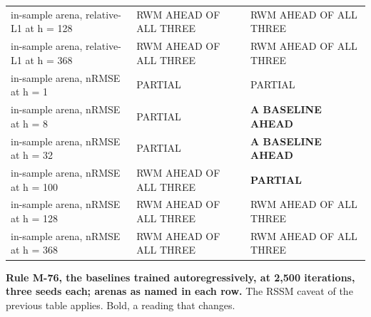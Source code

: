 \documentclass[10pt]{article}
\begin{document}
\begin{center}
{\begin{tabular}{lll}
in-sample arena, relative-L1 at h = 128 & RWM AHEAD OF ALL THREE & RWM AHEAD OF ALL THREE \\
in-sample arena, relative-L1 at h = 368 & RWM AHEAD OF ALL THREE & RWM AHEAD OF ALL THREE \\
in-sample arena, nRMSE at h = 1 & PARTIAL & PARTIAL \\
in-sample arena, nRMSE at h = 8 & PARTIAL & \textbf{A BASELINE AHEAD} \\
in-sample arena, nRMSE at h = 32 & PARTIAL & \textbf{A BASELINE AHEAD} \\
in-sample arena, nRMSE at h = 100 & RWM AHEAD OF ALL THREE & \textbf{PARTIAL} \\
in-sample arena, nRMSE at h = 128 & RWM AHEAD OF ALL THREE & RWM AHEAD OF ALL THREE \\
in-sample arena, nRMSE at h = 368 & RWM AHEAD OF ALL THREE & RWM AHEAD OF ALL THREE \\
\bottomrule\end{tabular}}\end{center}

\textbf{Rule M-76, the baselines trained autoregressively, at 2,500 iterations, three seeds each; arenas as named in each row.} The RSSM caveat of the previous table applies. Bold, a reading that changes.
\end{document}
